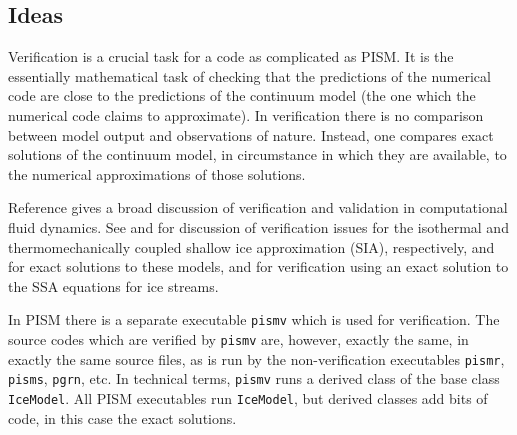 \documentclass[11pt,final]{amsart}
\begin{document}
\subsection{Ideas}  Verification is a crucial task for a code as complicated as PISM.  It is the essentially mathematical task of checking that the predictions of the numerical code are close to the predictions of the continuum model (the one which the numerical code claims to approximate).  In verification there is no comparison between model output and observations of nature.  Instead, one compares exact solutions of the continuum model, in circumstance in which they are available, to the numerical approximations of those solutions.

Reference \cite{Roache} gives a broad discussion of verification and validation in computational fluid dynamics. See \cite{BLKCB} and \cite{BBL} for discussion of verification issues for the isothermal and thermomechanically coupled shallow ice approximation (SIA), respectively, and for exact solutions to these models, and \cite{BBssasliding,SchoofStream} for verification using an exact solution to the SSA equations for ice streams.  

In PISM there is a separate executable \verb|pismv| which is used for verification.  The source codes which are verified by \verb|pismv| are, however, exactly the same, in exactly the same source files, as is run by the non-verification executables \verb|pismr|, \verb|pisms|, \verb|pgrn|, etc.  In technical terms, \verb|pismv| runs a derived class of the base class \verb|IceModel|.  All PISM executables run \verb|IceModel|, but derived classes add bits of code, in this case the exact solutions.
\end{document}
